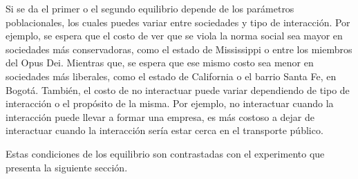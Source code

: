 Si se da el primer o el segundo equilibrio depende de los parámetros poblacionales, los cuales puedes variar entre sociedades y tipo de interacción. Por ejemplo, se espera que el costo de ver que se viola la norma social sea mayor en sociedades más conservadoras, como el estado de Mississippi o entre los miembros del Opus Dei. Mientras que, se espera que ese mismo costo sea menor en sociedades más liberales, como el estado de California o el barrio Santa Fe, en Bogotá. También, el costo de no interactuar puede variar dependiendo de tipo de interacción o el propósito de la misma. Por ejemplo, no interactuar cuando la interacción puede llevar a formar una empresa, es más costoso a dejar de interactuar cuando la interacción sería estar cerca en el transporte público. 

Estas condiciones de los equilibrio son contrastadas con el experimento que presenta la siguiente sección. 
